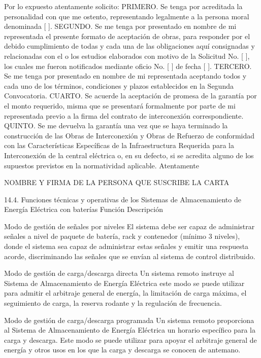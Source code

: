 Por lo expuesto atentamente solicito:
PRIMERO. Se tenga por acreditada la personalidad con que me ostento, representando legalmente a la persona moral denominada [ ].
SEGUNDO. Se me tenga por presentado en nombre de mi representada el presente formato de aceptación de obras, para responder por el debido cumplimiento de todas y cada una de las obligaciones aquí consignadas y relacionadas con el o los estudios elaborados con motivo de la Solicitud No. [ ], los cuales me fueron notificados mediante oficio No. [ ] de fecha [ ].
TERCERO. Se me tenga por presentado en nombre de mi representada aceptando todos y cada uno de los términos, condiciones y plazos establecidos en la Segunda Convocatoria.
CUARTO. Se acuerde la aceptación de promesa de la garantía por el monto requerido, misma que se presentará formalmente por parte de mi representada previo a la firma del contrato de interconexión correspondiente.
QUINTO. Se me devuelva la garantía una vez que se haya terminado la construcción de las Obras de Interconexión y Obras de Refuerzo de conformidad con las Características Específicas de la Infraestructura Requerida para la Interconexión de la central eléctrica o, en su defecto, si se acredita alguno de los supuestos previstos en la normatividad aplicable.
Atentamente

NOMBRE Y FIRMA DE LA PERSONA QUE SUSCRIBE LA CARTA

 
 \par
14.4. Funciones técnicas y operativas de los Sistemas de Almacenamiento de Energía Eléctrica con baterías
Función
 Descripción
 
 Modo de gestión de señales por niveles
 El sistema debe ser capaz de administrar señales a nivel de paquete de batería, rack y contenedor (mínimo 3 niveles), donde el sistema sea capaz de administrar estas señales y emitir una respuesta acorde, discriminando las señales que se envían al sistema de control distribuido.
 
 Modo de gestión de carga/descarga directa
 Un sistema remoto instruye al Sistema de Almacenamiento de Energía Eléctrica este modo se puede utilizar para admitir el arbitraje general de energía, la limitación de carga máxima, el seguimiento de carga, la reserva rodante y la regulación de frecuencia.
 
 Modo de gestión de carga/descarga programada
 Un sistema remoto proporciona al Sistema de Almacenamiento de Energía Eléctrica un horario específico para la carga y descarga. Este modo se puede utilizar para apoyar el arbitraje general de energía y otros usos en los que la carga y descarga se conocen de antemano.
 
